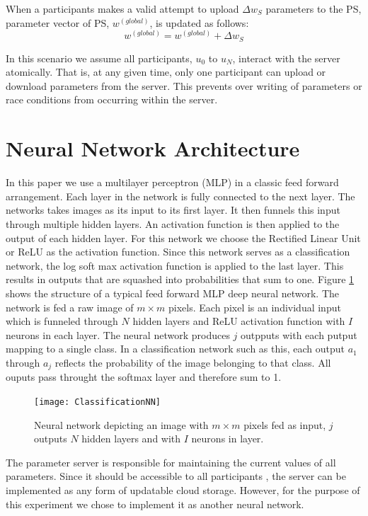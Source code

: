 \documentclass[conference]{IEEEtran}
\begin{document}
When a participants makes a valid attempt to upload $\Delta w_S$ parameters to the PS, parameter vector of PS,  $w^{(global)}$, is updated as follows:
$$w^{(global)} =  w^{(global)} +  \Delta w_S$$

In this scenario we assume all participants, $u_0$ to $u_N$, interact with the server atomically.
That is, at any given time, only one participant can upload or download parameters from the server. This prevents over writing of parameters or race conditions from occurring within the server.

\section{Neural Network Architecture}

In this paper we use a multilayer perceptron (MLP) in a classic feed forward arrangement. Each layer in the network is fully connected to the next layer. The networks takes images as its input to its first layer. It then funnels this input through multiple hidden layers. An activation function is then applied to the output of each hidden layer. For this network we choose the Rectified Linear Unit or ReLU as the activation function. Since this network serves as a classification network, the log soft max activation function is applied to the last layer. This results in outputs that are squashed into probabilities that sum to one. 
Figure \ref{fig:ClassNN} shows the structure of a typical feed forward MLP deep neural network. The network is fed a raw image of  $m \times m$ pixels. Each pixel is an individual input which is funneled through $N$ hidden layers and ReLU activation function with $I$ neurons in each layer. The neural network produces $j$ outpputs with each putput mapping to a single class. In a classification network such as this, each output $a_1$ through $a_j$ reflects the probability of the image belonging to that class. All ouputs pass throught the softmax layer and therefore sum to 1. 

\begin{figure}[!h]
\texttt{[image: ClassificationNN]}
\caption{Neural network depicting an image with $m \times m$ pixels fed as input, $j$ outputs  $N$  hidden layers and with $I$ neurons in layer.}
\label{fig:ClassNN}
\end{figure}
The parameter server is responsible for maintaining the current values of all parameters. Since it should be accessible to all
participants , the server can be implemented as any form of updatable cloud storage. However, for the purpose of this experiment we
chose to implement it as another neural network. 
\end{document}
